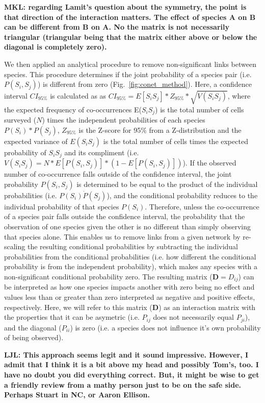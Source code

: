\documentclass[11pt,twocolumn,twoside,lineno]{pnas-new}
\begin{document}
{\textbf{MKL: regarding Lamit's question about the symmetry, the point
  is that direction of the interaction matters. The effect of species
  A on B can be different from B on A. No the matrix is not
  necessarily triangular (triangular being that the matrix either
  above or below the diagonal is completely zero).}

We then applied an analytical procedure to remove non-significant
links between species. This procedure determines if the joint
probability of a species pair (i.e. $P(S_i,S_j)$) is different from
zero (Fig.~\ref{fig:conet_method}).  Here, a confidence interval
$CI_{95\%}$ is calculated as as $CI_{95\%} = E[S_iS_j] * Z_{95\%} *
\sqrt{V(S_iS_j)}$, where the expected frequency of co-occurrences
E($S_iS_j$) is the total number of cells surveyed ($N$) times the
independent probabilities of each species $P(S_i) * P(S_j)$,
$Z_{95\%}$ is the Z-score for 95\% from a Z-distribution and the
expected variance of $E(S_iS_j)$ is the total number of cells times
the expected probability of $S_iS_j$ and its compliment
(i.e. $V(S_iS_j) = N * E[P(S_i,S_j)] * (1 - E[P(S_i,S_j)])$). If the
observed number of co-occurrence falls outside of the confidence
interval, the joint probability $P(S_i,S_j)$ is determined to be equal
to the product of the individual probabilities (i.e. $P(S_i) \dot
P(S_j)$), and the conditional probability reduces to the individual
probability of that species $P(S_i)$. Therefore, unless the
co-occurrence of a species pair falls outside the confidence interval,
the probability that the observation of one species given the other is
no different than simply observing that species alone. This enables us
to remove links from a given network by re-scaling the resulting
conditional probabilities by subtracting the individual probabilities
from the conditional probabilities (i.e. how different the conditional
probability is from the independent probability), which makes any
species with a non-significant conditional probability zero. The
resulting matrix ($\mathbf{D} = D_{ij}$) can be interpreted as how one
species impacts another with zero being no effect and values less than
or greater than zero interpreted as negative and positive effects,
respectively. Here, we will refer to this matrix ($\mathbf{D}$) as an
interaction matrix with the properties that it can be asymetric
(i.e. $P_{ij}$ does not necessarily equal $P_{ji}$), and the diagonal
($P_{ii}$) is zero (i.e. a species does not influence it's own
probability of being observed).

\textbf{LJL: This approach seems legit and it sound
  impressive. However, I admit that I think it is a bit above my head
  and possibly Tom’s, too. I have no doubt you did everything
  correct. But, it might be wise to get a friendly review from a mathy
  person just to be on the safe side. Perhaps Stuart in NC, or Aaron
  Ellison.} 

}
\end{document}
